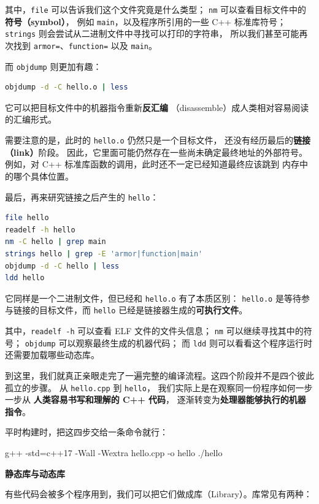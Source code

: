 \begin{example}[亲眼看到四种产物]
其中，\texttt{file} 可以告诉我们这个文件究竟是什么类型；
\texttt{nm} 可以查看目标文件中的\textbf{符号（symbol）}，
例如 \texttt{main}，以及程序所引用的一些 C++ 标准库符号；
\texttt{strings} 则会尝试从二进制文件中寻找可以打印的字符串，
所以我们甚至可能再次找到 \texttt{armor=}、\texttt{function=}
以及 \texttt{main}。

而 \texttt{objdump} 则更加有趣：

\begin{lstlisting}[language=bash]
objdump -d -C hello.o | less
\end{lstlisting}

它可以把目标文件中的机器指令重新\textbf{反汇编}
（disassemble）成人类相对容易阅读的汇编形式。

需要注意的是，此时的 \texttt{hello.o} 仍然只是一个目标文件，
还没有经历最后的\textbf{链接（link）}阶段。
因此，它里面可能仍然存在一些尚未确定最终地址的外部符号。
例如，对 C++ 标准库函数的调用，此时还不一定已经知道最终应该跳到
内存中的哪个具体位置。

最后，再来研究链接之后产生的 \texttt{hello}：

\begin{lstlisting}[language=bash]
file hello
readelf -h hello
nm -C hello | grep main
strings hello | grep -E 'armor|function|main'
objdump -d -C hello | less
ldd hello
\end{lstlisting}

它同样是一个二进制文件，但已经和 \texttt{hello.o} 有了本质区别：
\texttt{hello.o} 是等待参与链接的目标文件，而 \texttt{hello}
已经是链接器生成的\textbf{可执行文件}。

其中，\texttt{readelf -h} 可以查看 ELF 文件的文件头信息；
\texttt{nm} 可以继续寻找其中的符号；
\texttt{objdump} 可以观察最终生成的机器代码；
而 \texttt{ldd} 则可以看看这个程序运行时还需要加载哪些动态库。

到这里，我们就真正亲眼走完了一遍完整的编译流程。这四个阶段并不是四个彼此孤立的步骤。
从 \texttt{hello.cpp} 到 \texttt{hello}，
我们实际上是在观察同一份程序如何一步一步从
\textbf{人类容易书写和理解的 C++ 代码}，
逐渐转变为\textbf{处理器能够执行的机器指令}。

平时构建时，把这四步交给一条命令就行：
\begin{tbash}
g++ -std=c++17 -Wall -Wextra hello.cpp -o hello
./hello
\end{tbash}
\end{example}

\textbf{静态库与动态库}

有些代码会被多个程序用到，我们可以把它们做成库（Library）。库常见有两种：

